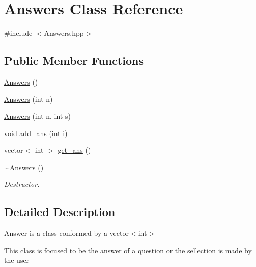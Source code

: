 \hypertarget{class_answers}{\section{Answers Class Reference}
\label{class_answers}
}


{\ttfamily \#include $<$Answers.\+hpp$>$}

\subsection*{Public Member Functions}
\begin{DoxyCompactItemize}
\item 
\hyperlink{class_answers_a086ca4b89b92048a18a2f03a56bf939c}{Answers} ()
\item 
\hyperlink{class_answers_a50fed75a419899e378cb414a0feeafe5}{Answers} (int n)
\item 
\hyperlink{class_answers_aa68607fa9eca1dd77051508d3d19fd93}{Answers} (int n, int s)
\item 
void \hyperlink{class_answers_a319ff5a552ff021dc289fa977b4de285}{add\+\_\+ans} (int i)
\item 
vector$<$ int $>$ \hyperlink{class_answers_a7c634663a8832fc41c07fd70349d9e72}{get\+\_\+ans} ()
\item 
\hyperlink{class_answers_aab5e74ea364d110c732670da14a46d3d}{$\sim$\+Answers} ()
\begin{DoxyCompactList}\small\item\em Destructor. \end{DoxyCompactList}\end{DoxyCompactItemize}


\subsection{Detailed Description}
Answer is a class conformed by a vector$<$int$>$

This class is focused to be the answer of a question or the sellection is made by the user 

